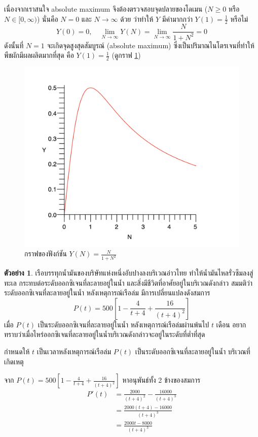 \documentclass[
]{book}
\theoremstyle{definition}
\theoremstyle{definition}
\newtheorem{example}{ตัวอย่าง}[chapter]
\theoremstyle{definition}
\theoremstyle{definition}
\theoremstyle{remark}
\begin{document}
เนื่องจากเราสนใจ absolute maximum จึงต้องตรวจสอบจุดปลายของโดเมน (\(N \ge 0\)
หรือ \(N \in [0,\infty)\)) นั่นคือ \(N=0\) และ \(N \rightarrow \infty\) ด้วย ว่าทำให้
\(Y\) มีค่ามากกว่า \(Y(1)= \frac{1}{2}\) หรือไม่
\[Y(0)=0,   \quad  \lim_{N \rightarrow \infty} Y(N) =\lim_{N \rightarrow \infty} \frac{N}{1+N^2} = 0\]
ดังนั้นที่ \(N=1\) จะเกิดจุดสูงสุดสัมบูรณ์ (absolute maximum)
ซึ่งเป็นปริมาณไนโตรเจนที่ทำให้พืชผักมีผลผลิตมากที่สุด คือ \(Y(1)= \frac{1}{2}\) (ดูกราฟ
\ref{fig:graph8})

\begin{figure}

{\centering \includegraphics[width=0.5\linewidth]{images/graph8} 

}

\caption{กราฟของฟังก์ชัน $Y(N) = \frac{N}{1 + N^2}$}\label{fig:graph8}
\end{figure}

\begin{example}
เรือบรรทุกน้ำมันของบริษัทแห่งหนึ่งอับปางลงบริเวณอ่าวไทย ทำให้น้ำมันไหลรั่วซึมลงสู่ทะเล
กระทบต่อระดับออกซิเจนที่ละลายอยู่ในน้ำ และสิ่งมีชีวิตที่อาศัยอยู่ในบริเวณดังกล่าว
สมมติว่าระดับออกซิเจนที่ละลายอยู่ในน้ำ หลังเหตุการณ์เรือล่ม มีการเปลี่ยนแปลงดังสมการ
\[P(t)=500[1- \frac{4}{t+4} + \frac{16}{(t+4)^2}]\] เมื่อ \(P(t)\)
เป็นระดับออกซิเจนที่ละลายอยู่ในน้ำ หลังเหตุการณ์เรือล่มผ่านพ้นไป \(t\) เดือน
อยากทราบว่าเมื่อไหร่ออกซิเจนที่ละลายอยู่ในน้ำบริเวณดังกล่าวจะอยู่ในระดับที่ต่ำที่สุด
\end{example}

กำหนดให้ \(t\) เป็นเวลาหลังเหตุการณ์เรือล่ม \(P(t)\) เป็นระดับออกซิเจนที่ละลายอยู่ในน้ำ
บริเวณที่เกิดเหตุ

จาก \(P(t)=500[1- \frac{4}{t+4} + \frac{16}{(t+4)^2}]\) หาอนุพันธ์ทั้ง 2
ข้างของสมการ \begin{equation}   \begin{aligned}
    P'(t) &= \frac{2000}{(t+4)^2} - \frac{16000}{(t+4)^3} \\
          &=\frac{2000(t+4)-16000}{(t+4)^3} \\
          &=\frac{2000t-8000}{(t+4)^3}
  \end{aligned} \end{equation}
\end{document}
